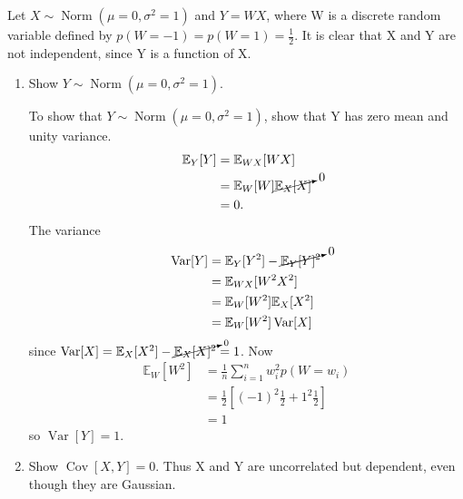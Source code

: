 \begin{example}
	Let $X\sim \operatorname{Norm}(\mu =0, \sigma^2 = 1)$ and $Y = WX$, where W is a discrete random variable defined by $p(W=-1)=p(W=1)=\frac{1}{2}$. It is clear that X and Y are not independent, since Y is a function of X.
	\begin{enumerate}
		\item Show $Y\sim \operatorname{Norm}(\mu =0, \sigma^2 = 1)$.\newline
		
		To show that $Y\sim \operatorname{Norm}(\mu =0, \sigma^2 = 1)$, show that Y has zero mean and unity variance.
		\begin{equation}
			\begin{split}
				\mathbb{E}_Y[Y] &= \mathbb{E}_{WX}[WX]\\
				&=\mathbb{E}_W[W]\cancelto{0}{\mathbb{E}_X[X]}\\
				&=0.
			\end{split}
		\end{equation}
		The variance
		\begin{equation}
			\begin{split}
				\operatorname{Var}[Y] &= \mathbb{E}_Y[Y^2]-\cancelto{0}{\mathbb{E}_Y[Y]^2}\\
				& = \mathbb{E}_{WX}[W^2X^2]\\
				&= \mathbb{E}_W[W^2]\mathbb{E}_X[X^2]\\
				& = \mathbb{E}_W[W^2]\operatorname{Var}[X]
			\end{split}
		\end{equation}
		since $\operatorname{Var}[X]=\mathbb{E}_X[X^2]-\cancelto{0}{\mathbb{E}_X[X]^2}=1$. Now
		\begin{equation}
			\begin{split}
				\mathbb{E}_W[W^2]&= \frac{1}{n}\sum_{i=1}^nw_i^2p(W = w_i)\\
				&= \frac{1}{2}[(-1)^2\frac{1}{2}+1^2\frac{1}{2}]\\
				&= 1
			\end{split}
		\end{equation}
		so $\operatorname{Var}[Y] =1$.
		\item Show $\operatorname{Cov}[X,Y]=0$. Thus X and Y are uncorrelated but dependent, even though they are Gaussian.
		

\end{enumerate}
\end{example}
